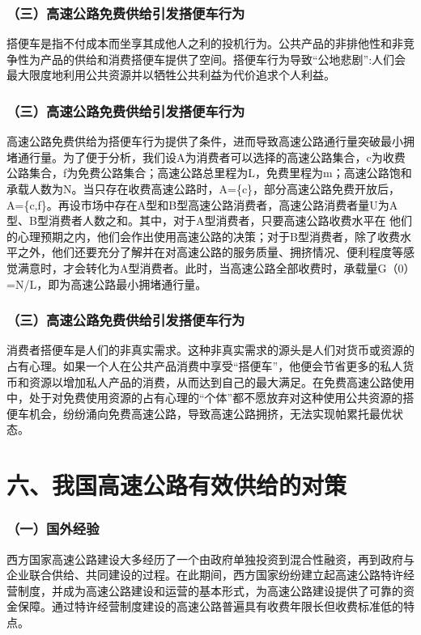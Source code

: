 \documentclass[aspectratio=169, 12pt]{beamer}
\begin{document}
\begin{frame}[plain]
    \frametitle{（三）高速公路免费供给引发搭便车行为}
    搭便车是指不付成本而坐享其成他人之利的投机行为。公共产品的非排他性和非竞争性为产品的供给和消费搭便车提供了空间。搭便车行为导致“公地悲剧”:人们会最大限度地利用公共资源并以牺牲公共利益为代价追求个人利益。
\end{frame}

\begin{frame}[plain]
    \frametitle{（三）高速公路免费供给引发搭便车行为}
    高速公路免费供给为搭便车行为提供了条件，进而导致高速公路通行量突破最小拥堵通行量。为了便于分析，我们设A为消费者可以选择的高速公路集合，c为收费公路集合，f为免费公路集合；高速公路总里程为L，免费里程为m；高速公路饱和承载人数为N。当只存在收费高速公路时，A=\{c\}，部分高速公路免费开放后，A=\{c,f\}。再设市场中存在A型和B型高速公路消费者，高速公路消费者量U为A型、B型消费者人数之和。其中，对于A型消费者，只要高速公路收费水平在
    他们的心理预期之内，他们会作出使用高速公路的决策；对于B型消费者，除了收费水平之外，他们还要充分了解并在对高速公路的服务质量、拥挤情况、便利程度等感觉满意时，才会转化为A型消费者。此时，当高速公路全部收费时，承载量G（0）=N/L，即为高速公路最小拥堵通行量。
\end{frame}

\begin{frame}[plain]
    \frametitle{（三）高速公路免费供给引发搭便车行为}
    消费者搭便车是人们的非真实需求。这种非真实需求的源头是人们对货币或资源的占有心理。如果一个人在公共产品消费中享受“搭便车”，他便会节省更多的私人货币和资源以增加私人产品的消费，从而达到自己的最大满足。在免费高速公路使用中，处于对免费使用资源的占有心理的“个体”都不愿放弃对这种使用公共资源的搭便车机会，纷纷涌向免费高速公路，导致高速公路拥挤，无法实现帕累托最优状态。
\end{frame}

\section{六、我国高速公路有效供给的对策}

\begin{frame}[plain]
    \frametitle{（一）国外经验}
    西方国家高速公路建设大多经历了一个由政府单独投资到混合性融资，再到政府与企业联合供给、共同建设的过程。在此期间，西方国家纷纷建立起高速公路特许经营制度，并成为高速公路建设和运营的基本形式，为高速公路建设提供了可靠的资金保障。通过特许经营制度建设的高速公路普遍具有收费年限长但收费标准低的特点。
\end{frame}
\end{document}
